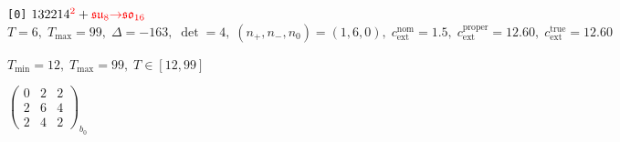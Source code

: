 \documentclass[10pt]{article}
\begin{document}
\texttt{[0]} $132214^{\textcolor{red}{2}} + \textcolor{red}{\mathfrak{su}_8{\to}\mathfrak{so}_{16}}$ \quad $T=6,\;T_{\max}=99,\;\Delta=-163,\;\det=4,\;(n_+,n_-,n_0)=(1,6,0),\;c_\mathrm{ext}^{\mathrm{nom}}=1.5,\;c_\mathrm{ext}^{\mathrm{proper}}=12.60,\;c_\mathrm{ext}^{\mathrm{true}}=12.60$

\hspace{1em}$T_{\min}=12,\;T_{\max}=99,\;T\in[12,99]$

\hspace{2em}$\left(\begin{smallmatrix}0 & 2 & 2 \\ 2 & 6 & 4 \\ 2 & 4 & 2\end{smallmatrix}\right)_{\!b_0}$
\end{document}
